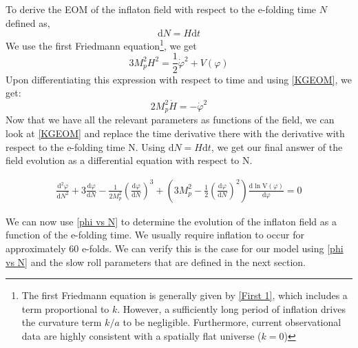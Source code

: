 \documentclass[aps,prd,reprint,preprintnumbers,showpacs,floatfix,nofootinbib,superscript address]{revtex4-2}
\begin{document}
 To derive the EOM of the inflaton field with respect to the e-folding time $N$ defined as,
 \begin{equation}
     \text{d}N =  H \text{d}t
 \end{equation}
 We use the first Friedmann equation\footnote{The first Friedmann equation is generally given by \cref{First 1}, which includes a term proportional to $k$. However, a sufficiently long period of inflation drives the curvature term $k/a$ to be negligible. Furthermore, current observational data are highly consistent with a spatially flat universe ($k=0$)}, we get
\begin{equation}    \label{Friedmann 3}
    3 M_p^2H^2 = \frac{1}{2} \dot{\varphi}^2 + V(\varphi)
\end{equation}
Upon differentiating this expression with respect to time and using \cref{KGEOM}, we get:
\begin{equation} \label{H vs phi}
    2 M_p^2 \dot{H} = -   \dot{\varphi}^2
\end{equation}
Now that we have all the relevant parameters as functions of the field, we can look at \cref{KGEOM} and replace the time derivative there with the derivative with respect to the e-folding time N. Using $\text{d}N = H \text{d}t$, we get our final answer of the field evolution as a differential equation with respect to N.
\begin{widetext}
\begin{align}\label{phi vs N}
    \frac{\text{d}^2\varphi}{\text{d}N^2} +3 \frac{\text{d}\varphi}{\text{d}N}  - \frac{1}{2M_p^2} \left(\frac{\text{d}\varphi}{\text{d}N} \right)^3   +  \left( 3 M_p^2 - \frac{1}{2} \left(\frac{\text{d}\varphi}{\text{d}N} \right)^2 \right) \frac{\text{d}\ln \text{V}(\varphi)}{\text{d} \varphi} = 0    
\end{align}
\end{widetext}
We can now use \cref{phi vs N} to determine the evolution of the inflaton field as a function of the e-folding time. We usually require inflation to occur for approximately 60 e-folds. We can verify this is the case for our model using \cref{phi vs N} and the slow roll parameters that are defined in the next section.
\end{document}
